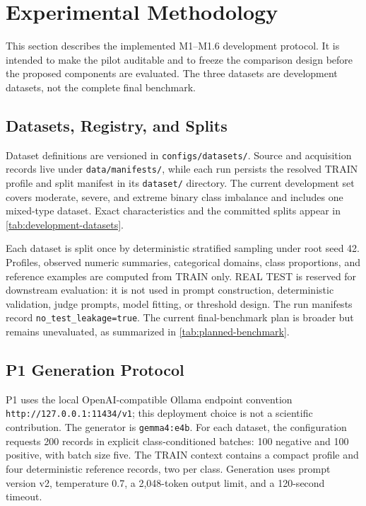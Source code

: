 \section{Experimental Methodology}
\label{sec:experiments}

This section describes the implemented M1--M1.6 development protocol. It is
intended to make the pilot auditable and to freeze the comparison design before
the proposed \rcqasyn{} components are evaluated. The three datasets are
development datasets, not the complete final benchmark.

\subsection{Datasets, Registry, and Splits}

Dataset definitions are versioned in \texttt{configs/datasets/}. Source and
acquisition records live under \texttt{data/manifests/}, while each run persists the
resolved TRAIN profile and split manifest in its \texttt{dataset/} directory. The
current development set covers moderate, severe, and extreme binary class
imbalance and includes one mixed-type dataset. Exact characteristics and the
committed splits appear in \cref{tab:development-datasets}.



Each dataset is split once by deterministic stratified sampling under root
seed 42. Profiles, observed numeric summaries, categorical domains, class
proportions, and reference examples are computed from TRAIN only. REAL TEST is
reserved for downstream evaluation: it is not used in prompt construction,
deterministic validation, judge prompts, model fitting, or threshold design.
The run manifests record \texttt{no\_test\_leakage=true}. The current final-benchmark
plan is broader but remains unevaluated, as summarized in
\cref{tab:planned-benchmark}.



\subsection{P1 Generation Protocol}
\label{sec:p1-protocol}

P1 uses the local OpenAI-compatible Ollama endpoint convention
\texttt{http://127.0.0.1:11434/v1}; this deployment choice is not a scientific
contribution. The generator is \texttt{gemma4:e4b}. For each dataset, the configuration
requests 200 records in explicit class-conditioned batches: 100 negative and
100 positive, with batch size five. The TRAIN context contains a compact
profile and four deterministic reference records, two per class. Generation
uses prompt version v2, temperature 0.7, a 2,048-token output limit, and a
120-second timeout.


